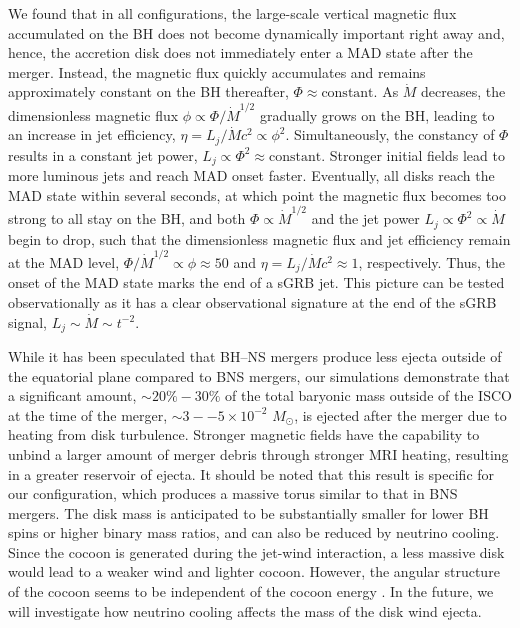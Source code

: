 \documentclass[twocolumn,dvipsnames]{aastex62}
\newcommand{\msun}{\,{M_{\odot}}}
\begin{document}
We found that in all configurations, the large-scale vertical magnetic flux accumulated on the BH does not become dynamically important right away and, hence, the accretion disk does not immediately enter a MAD state after the merger. Instead, the magnetic flux quickly accumulates and remains approximately constant on the BH thereafter,  $\Phi\approx \text{constant}$. As $\dot M$ decreases, the dimensionless magnetic flux $\phi\propto \Phi/\dot{M}^{1/2}$ gradually grows on the BH, leading to an increase in jet efficiency, $\eta = L_j/\dot M c^2 \propto \phi^2$. Simultaneously, the constancy of $\Phi$ results in a constant jet power, $L_j \propto \Phi^2 \approx \text{constant}$. Stronger initial fields lead to more luminous jets and reach MAD onset faster. Eventually, all disks reach the MAD state within several seconds, at which point the magnetic flux becomes too strong to all stay on the BH, and both $\Phi \propto \dot M^{1/2}$ and the jet power $L_j \propto \Phi^2 \propto \dot M$ begin to drop, such that the dimensionless magnetic flux and jet efficiency remain at the MAD level, $\Phi/\dot M^{1/2} \propto \phi \approx 50$ and $\eta = L_j/\dot M c^2 \approx 1$, respectively. Thus, the onset of the MAD state marks the end of a sGRB jet. This picture can be tested observationally as it has a clear observational signature at the end of the sGRB signal, $ L_j \sim \dot{M} \sim t^{-2} $.

While it has been speculated that BH--NS mergers produce less ejecta outside of the equatorial plane compared to BNS mergers, our simulations demonstrate that a significant amount, $ \sim 20\%-30\% $ of the total baryonic mass outside of the ISCO at the time of the merger, $ \sim 3--5 \times 10^{-2}\,\msun $, is ejected after the merger due to heating from disk turbulence. Stronger magnetic fields have the capability to unbind a larger amount of merger debris through stronger MRI heating, resulting in a greater reservoir of ejecta. It should be noted that this result is specific for our configuration, which produces a massive torus similar to that in BNS mergers. The disk mass is anticipated to be substantially smaller for lower BH spins or higher binary mass ratios, and can also be reduced by neutrino cooling. Since the cocoon is generated during the jet-wind interaction, a less massive disk would lead to a weaker wind and lighter cocoon. However, the angular structure of the cocoon seems to be independent of the cocoon energy \citep[see for comparison][]{Gottlieb2020b,Gottlieb2021a,Gottlieb2022d}. In the future, we will investigate how neutrino cooling affects the mass of the disk wind ejecta.
\end{document}
